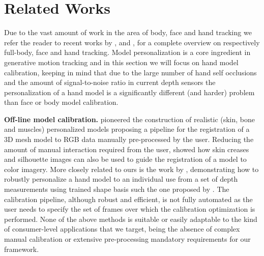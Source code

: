 \section{Related Works}
Due to the vast amount of work in the area of body, face and hand tracking we refer the reader to recent works by \cite{bogo2015detailed}, \cite{cao2016real} and \cite{taylor2016joint}, \cite{tkach2016sphere} for a complete overview on respectively full-body, face and hand tracking.
Model personalization is a core ingredient in generative motion tracking \cite{pons2011model} and in this section we will focus on hand model calibration, keeping in mind that due to the large number of hand self occlusions and the amount of signal-to-noise ratio in current depth sensors the personalization of a hand model is a significantly different (and harder) problem than face or body model calibration.  

\textbf{Off-line model calibration.}
\cite{albrecht2003construction} pioneered the construction of realistic (skin, bone and muscles) personalized models proposing a pipeline for the registration of a 3D mesh model to RGB data manually pre-processed by the user. Reducing the amount of manual interaction required from the user, \cite{rhee2006human} showed how skin creases and silhouette images can also be used to guide the registration of a model to color imagery. More closely related to ours is the work by \cite{tan2016fits}, demonstrating how to robustly personalize a hand model to an individual use from a set of depth measurements using trained shape basis such the one proposed by \cite{taylor2014user}. The calibration pipeline, although robust and efficient, is not fully automated as the user needs to specify the set of frames over which the calibration optimization is performed. None of the above methods is suitable or easily adaptable to the kind of consumer-level applications that we target, being the absence of complex manual calibration or extensive pre-processing mandatory requirements for our framework.

